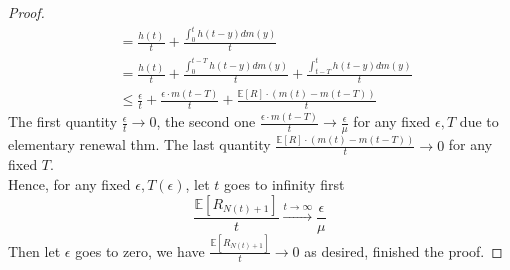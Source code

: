 \documentclass[a4paper, 10pt]{article}
\theoremstyle{definition}
\theoremstyle{hSol}
\begin{document}
\begin{proof}
\begin{equation}
\begin{split}
    &= \frac{h(t)}{t} + \frac{\int_0^t h(t-y)dm(y)}{t} \\
    &= \frac{h(t)}{t} + \frac{\int_0^{t-T} h(t-y)dm(y)}{t} + \frac{\int_{t-T}^{t} h(t-y)dm(y)}{t} \\
    &\leq \frac{\epsilon}{t} + \frac{\epsilon \cdot m(t-T)}{t} + \frac{\mathbb{E}\left[R\right]\cdot (m(t)-m(t-T))}{t}
  \end{split}
\end{equation}
The first quantity $\frac{\epsilon}{t}\to 0$, the second one $\frac{\epsilon \cdot m(t-T)}{t} \to \frac{\epsilon}{\mu}$ for any fixed $\epsilon,T$ due to elementary renewal thm. The last quantity $\frac{\mathbb{E}\left[R\right]\cdot (m(t)-m(t-T))}{t} \to 0$ for any fixed $T$.\\
Hence, for any fixed $\epsilon, T(\epsilon)$, let $t$ goes to infinity first
\begin{equation}
  \frac{\mathbb{E}\left[R_{N(t)+1}\right]}{t} \xrightarrow{t\to \infty} \frac{\epsilon}{\mu}
\end{equation}
Then let $\epsilon$ goes to zero, we have $\frac{\mathbb{E}\left[R_{N(t)+1}\right]}{t} \to 0$ as desired, finished the proof.
\end{proof}
\end{document}
